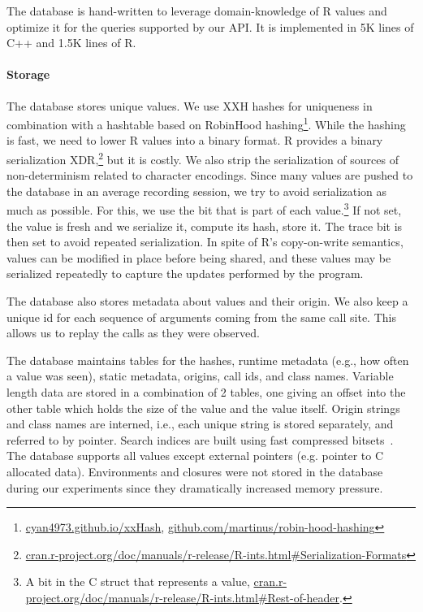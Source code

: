 \documentclass[sigplan,screen]{acmart}
\begin{document}
The database is hand-written to leverage domain-knowledge of
R values and optimize it for the queries supported by our API.  It is
implemented in 5K lines of C++ and 1.5K lines of R.

\paragraph{Storage}


The database stores unique values.  We use XXH hashes for
uniqueness in combination with a hashtable based on RobinHood
hashing\footnote{\url{cyan4973.github.io/xxHash},
\url{github.com/martinus/robin-hood-hashing}}.  While the hashing is
fast, we need to lower R values into a binary format.  R provides a
binary serialization XDR,\footnote{\url{cran.r-project.org/doc/manuals/r-release/R-ints.html\#Serialization-Formats}} but it is
costly.
We also strip the serialization of sources of non-determinism related
to character encodings.  Since many values are pushed to the database
in an average recording session, we try to avoid serialization as much
as possible.  For this, we use the  bit that is part of
each value.\footnote{A bit in the C struct that represents a value,
	\url{cran.r-project.org/doc/manuals/r-release/R-ints.html\#Rest-of-header}.}
If not set, the value is fresh and we serialize it, compute its hash,
store it. The trace bit is then set to avoid repeated serialization.
In spite of R's copy-on-write semantics, values can be modified in
place before being shared, and these values may be serialized repeatedly
to capture the updates performed by the program.

The database also stores metadata about values and their origin.  We
also keep a unique id for each sequence of arguments coming from the
same call site. This allows us to replay the calls as they were
observed.

The database maintains tables for the hashes, runtime metadata (e.g.,
how often a value was seen), static metadata, origins, call ids, and
class names.  Variable length data are
stored in a combination of 2 tables, one giving an offset into the
other table which holds the size of the value and the value itself.
Origin strings and class names are interned, i.e., each unique string
is stored separately, and referred to by pointer.  Search indices are
built using fast compressed bitsets~\cite{chambi2016better}.  The
database supports all values except external pointers (e.g. pointer to
C allocated data).  Environments and closures were not stored in the
database during our experiments since they dramatically increased
memory pressure.
\end{document}
